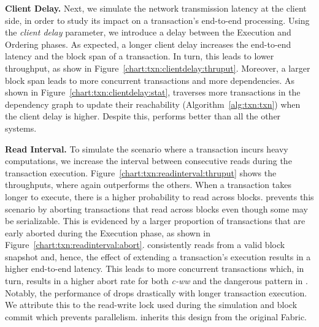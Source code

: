 \textbf{Client Delay.}
Next, we simulate the network transmission latency at the client side, in order to study its impact on a transaction's end-to-end processing.
Using the \textit{client delay} parameter, we introduce a delay between the Execution and Ordering phases.
As expected, a longer client delay increases the end-to-end latency and the block span of a transaction.
In turn, this leads to lower throughput, as show in Figure~\ref{chart:txn:clientdelay:thruput}.
Moreover, a larger block span leads to more concurrent transactions and more dependencies.
As shown in Figure~\ref{chart:txn:clientdelay:stat}, {\fsF} traverses more transactions in the dependency graph to update their reachability (Algorithm~\ref{alg:txn:txn}) when the client delay is higher.
Despite this, {\fsF} performs better than all the other systems.

\textbf{Read Interval.}
To simulate the scenario where a transaction incurs heavy computations, we increase the interval between consecutive reads during the transaction execution.
Figure~\ref{chart:txn:readinterval:thruput} shows the throughputs, where {\fsF} again outperforms the others. 
When a transaction takes longer to execute, there is a higher probability to read across blocks.
{\fsP} prevents this scenario by aborting transactions that read across blocks even though some may be serializable. 
This is evidenced by a larger proportion of transactions that are early aborted during the Execution phase, as shown in Figure~\ref{chart:txn:readinterval:abort}.
{\fsS} consistently reads from a valid block snapshot and, hence, the effect of extending a transaction's execution results in a higher end-to-end latency.
This leads to more concurrent transactions which, in turn, results in a higher abort rate for both \textit{c-ww} and the dangerous pattern in {\fsS}.
Notably, the performance of {\fsO} drops drastically with longer transaction execution.
We attribute this to the read-write lock used during the simulation and block commit which prevents parallelism.
{\fsO} inherits this design from the original Fabric. 

